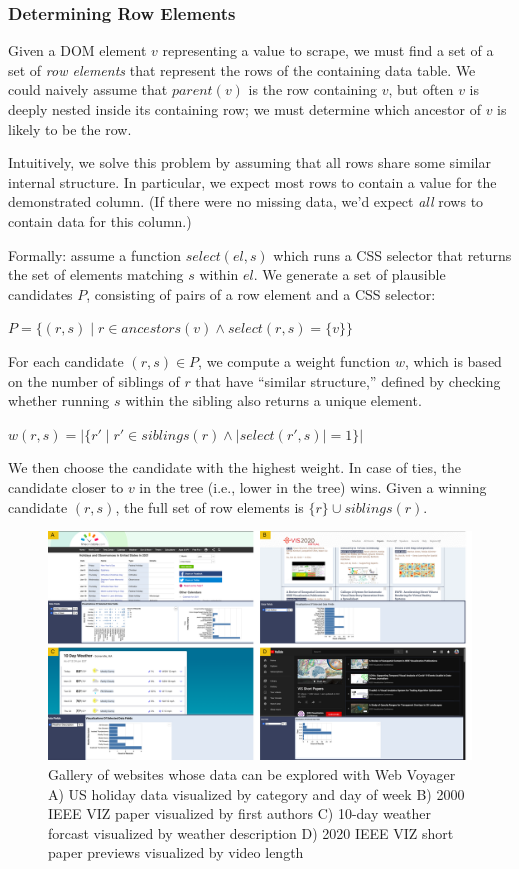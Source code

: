 \documentclass{vgtc}                          %
\begin{document}
\subsubsection{Determining Row Elements}

Given a DOM element \(v\) representing a value to scrape, we must find a
set of a set of \emph{row elements} that represent the rows of the
containing data table. We could naively assume that \(parent(v)\) is the
row containing \(v\), but often \(v\) is deeply nested inside its
containing row; we must determine which ancestor of \(v\) is likely to
be the row.

Intuitively, we solve this problem by assuming that all rows share some
similar internal structure. In particular, we expect most rows to
contain a value for the demonstrated column. (If there were no missing
data, we'd expect \emph{all} rows to contain data for this column.)

Formally: assume a function \(select(el, s)\) which runs a CSS selector
that returns the set of elements matching \(s\) within \(el\). We
generate a set of plausible candidates \(P\), consisting of pairs of a
row element and a CSS selector:

\(P = \{ (r, s) \mid r \in ancestors(v) \land select(r, s) = \{v\} \}\)

For each candidate \((r, s) \in P\), we compute a weight function \(w\),
which is based on the number of siblings of \(r\) that have ``similar
structure,'' defined by checking whether running \(s\) within the
sibling also returns a unique element.

\(w(r, s) = |\{ r' \mid r' \in siblings(r) \land |select(r', s) | = 1 \}|\)

We then choose the candidate with the highest weight. In case of ties,
the candidate closer to \(v\) in the tree (i.e., lower in the tree)
wins. Given a winning candidate \((r, s)\), the full set of row elements
is \(\{r\} \cup siblings(r)\).

\begin{figure}
  \includegraphics[width=\textwidth]{figures/gallery}
  \caption{\label{fig:example}Gallery of websites whose data can be explored with Web Voyager
  A) US holiday data visualized by category and day of week
  B) 2000 IEEE VIZ paper visualized by first authors
  C) 10-day weather forcast visualized by weather description
  D) 2020 IEEE VIZ short paper previews visualized by video length}
  \label{fig:gallery}
\end{figure}
\end{document}
